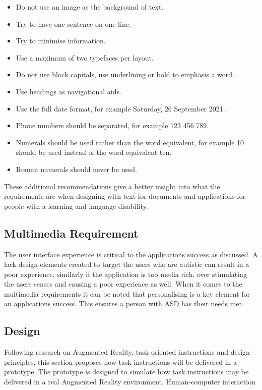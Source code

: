 \begin{itemize}
    \item Do not use an image as the background of text.
    \item Try to have one sentence on one line.
    \item Try to minimise information.
    \item Use a maximum of two typefaces per layout.
    \item Do not use block capitals, use underlining or bold to emphasis a word.
    \item Use headings as navigational aids.
    \item Use the full date format, for example Saturday, 26 September 2021.
    \item Phone numbers should be separated, for example 123 456 789.
    \item Numerals should be used rather than the word equivalent, for example 10 should be used instead of the word equivalent ten.
    \item Roman numerals should never be used.
\end{itemize}

These additional recommendations give a better insight into what the requirements are when designing with text for documents and applications for people with a learning and language disability.

\subsection {Multimedia Requirement}

The user interface experience is critical to the applications success as discussed. A lack design elements created to target the users who are autistic can result in a poor experience, similarly if the application is too media rich, over stimulating the users senses and causing a poor experience as well. When it comes to the multimedia requirements it can be noted that personalising is a key element for an applications success. This ensures a person with ASD has their needs met. 

\subsection{Design} 


Following research on Augmented Reality, task-oriented instructions and design principles, this section proposes how task instructions will be delivered in a prototype. The prototype is designed to simulate how task instructions may be delivered in a real Augmented Reality environment. Human-computer interaction

